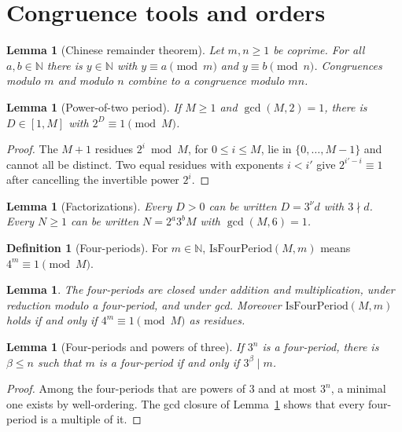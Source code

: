 \documentclass[11pt,reqno,oneside]{amsart}
\theoremstyle{plain}
\newtheorem{lemma}[theorem]{Lemma}
\theoremstyle{definition}
\newtheorem{definition}[theorem]{Definition}
\numberwithin{equation}{section}
\begin{document}
\section{Congruence tools and orders}\label{sec:congruence}

\begin{lemma}[Chinese remainder theorem]\label{lem:crt}
Let $m,n\ge1$ be coprime. For all $a,b\in\mathbb N$ there is $y\in\mathbb N$ with $y\equiv a\pmod m$ and $y\equiv b\pmod n$. Congruences modulo $m$ and modulo $n$ combine to a congruence modulo $mn$.
\end{lemma}

\begin{lemma}[Power-of-two period]\label{lem:pow2period}
If $M\ge1$ and $\gcd(M,2)=1$, there is $D\in[1,M]$ with $2^D\equiv1\pmod M$.
\end{lemma}
\begin{proof}
The $M+1$ residues $2^i\bmod M$, for $0\le i\le M$, lie in $\{0,\dots,M-1\}$ and cannot all be distinct. Two equal residues with exponents $i<i'$ give $2^{i'-i}\equiv1$ after cancelling the invertible power $2^i$.
\end{proof}

\begin{lemma}[Factorizations]\label{lem:factor}
Every $D>0$ can be written $D=3^\nu d$ with $3\nmid d$. Every $N\ge1$ can be written $N=2^a3^bM$ with $\gcd(M,6)=1$.
\end{lemma}

\begin{definition}[Four-periods]\label{def:fourper}
For $m\in\mathbb N$, $\mathrm{IsFourPeriod}(M,m)$ means $4^m\equiv1\pmod M$.
\end{definition}

\begin{lemma}\label{lem:fourper}
The four-periods are closed under addition and multiplication, under reduction modulo a four-period, and under gcd. Moreover $\mathrm{IsFourPeriod}(M,m)$ holds if and only if $4^m\equiv1\pmod M$ as residues.
\end{lemma}

\begin{lemma}[Four-periods and powers of three]\label{lem:order3}
If $3^n$ is a four-period, there is $\beta\le n$ such that $m$ is a four-period if and only if $3^\beta\mid m$.
\end{lemma}
\begin{proof}
Among the four-periods that are powers of $3$ and at most $3^n$, a minimal one exists by well-ordering. The gcd closure of Lemma~\ref{lem:fourper} shows that every four-period is a multiple of it.
\end{proof}
\end{document}
